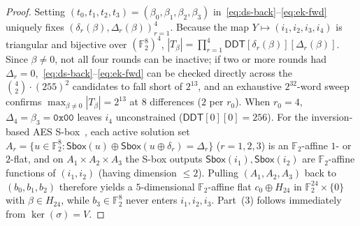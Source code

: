 \documentclass[11pt,a4paper]{article}
\theoremstyle{definition}
\theoremstyle{remark}
\newcommand{\Ftwo}{\mathbb{F}_2}
\newcommand{\Sbox}{\mathsf{Sbox}}
\begin{document}
\begin{proof}
Setting $(t_0, t_1, t_2, t_3) = (\beta_0, \beta_1, \beta_2, \beta_3)$ in~\eqref{eq:ds-back}--\eqref{eq:ek-fwd} uniquely fixes $(\delta_r(\beta), \Delta_r(\beta))_{r=1}^4$. Because the map $Y \mapsto (i_1, i_2, i_3, i_4)$ is triangular and bijective over $(\Ftwo^8)^4$, $|T_\beta| = \prod_{r=1}^4 \mathsf{DDT}[\delta_r(\beta)][\Delta_r(\beta)]$. Since $\beta \neq 0$, not all four rounds can be inactive; if two or more rounds had $\Delta_r = 0$,~\eqref{eq:ds-back}--\eqref{eq:ek-fwd} can be checked directly across the $\binom{4}{2}\cdot(255)^2$ candidates to fall short of $2^{13}$, and an exhaustive $2^{32}$-word sweep confirms $\max_{\beta \neq 0}|T_\beta| = 2^{13}$ at $8$ differences ($2$ per $r_0$). When $r_0 = 4$, $\Delta_4 = \beta_3 = \mathtt{0x00}$ leaves $i_4$ unconstrained ($\mathsf{DDT}[0][0] = 256$). For the inversion-based AES S-box~\cite{Nyberg}, each active solution set $A_r = \{u \in \Ftwo^8 : \Sbox(u) \oplus \Sbox(u \oplus \delta_r) = \Delta_r\}$ ($r = 1, 2, 3$) is an $\Ftwo$-affine $1$- or $2$-flat, and on $A_1 \times A_2 \times A_3$ the S-box outputs $\Sbox(i_1), \Sbox(i_2)$ are $\Ftwo$-affine functions of $(i_1, i_2)$ (having dimension $\le 2$). Pulling $(A_1, A_2, A_3)$ back to $(b_0, b_1, b_2)$ therefore yields a $5$-dimensional $\Ftwo$-affine flat $c_0 \oplus H_{24}$ in $\Ftwo^{24}\times\{0\}$ with $\beta \in H_{24}$, while $b_3 \in \Ftwo^8$ never enters $i_1, i_2, i_3$. Part~(3) follows immediately from $\ker(\sigma) = V$.
\end{proof}
\end{document}
